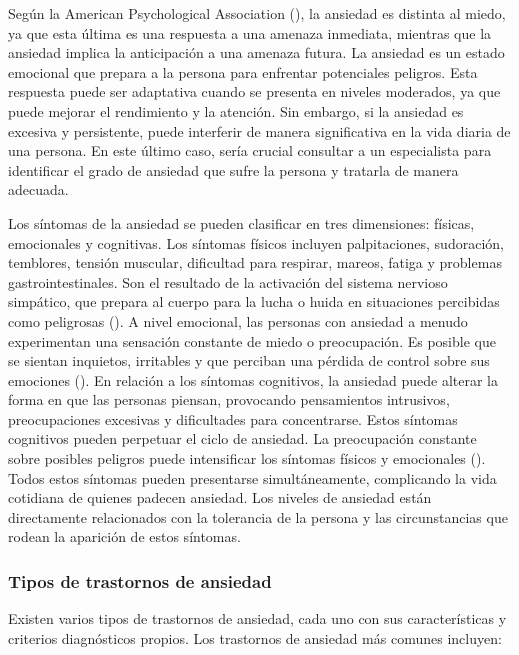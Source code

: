 Según la American Psychological Association (\citeyear{APA:2020}), la ansiedad es distinta al miedo, ya que esta última es una respuesta a una amenaza inmediata, mientras que la ansiedad implica la anticipación a una amenaza futura. La ansiedad es un estado emocional que prepara a la persona para enfrentar potenciales peligros. Esta respuesta puede ser adaptativa cuando se presenta en niveles moderados, ya que puede mejorar el rendimiento y la atención. Sin embargo, si la ansiedad es excesiva y persistente, puede interferir de manera significativa en la vida diaria de una persona. En este último caso, sería crucial consultar a un especialista para identificar el grado de ansiedad que sufre la persona y tratarla de manera adecuada.

Los síntomas de la ansiedad se pueden clasificar en tres dimensiones: físicas, emocionales y cognitivas. Los síntomas físicos incluyen palpitaciones, sudoración, temblores, tensión muscular, dificultad para respirar, mareos, fatiga y problemas gastrointestinales. Son el resultado de la activación del sistema nervioso simpático, que prepara al cuerpo para la lucha o huida en situaciones percibidas como peligrosas (\cite{CRASKE:2016}). A nivel emocional, las personas con ansiedad a menudo experimentan una sensación constante de miedo o preocupación. Es posible que se sientan inquietos, irritables y que perciban una pérdida de control sobre sus emociones (\cite{BARLOW:2002}). En relación a los síntomas cognitivos, la ansiedad puede alterar la forma en que las personas piensan, provocando pensamientos intrusivos, preocupaciones excesivas y dificultades para concentrarse. Estos síntomas cognitivos pueden perpetuar el ciclo de ansiedad. La preocupación constante sobre posibles peligros puede intensificar los síntomas físicos y emocionales (\cite{CLARK:2011}). Todos estos síntomas pueden presentarse simultáneamente, complicando la vida cotidiana de quienes padecen ansiedad. Los niveles de ansiedad están directamente relacionados con la tolerancia de la persona y las circunstancias que rodean la aparición de estos síntomas.

\subsubsection{Tipos de trastornos de ansiedad}
Existen varios tipos de trastornos de ansiedad, cada uno con sus características y criterios diagnósticos propios. Los trastornos de ansiedad más comunes incluyen:

